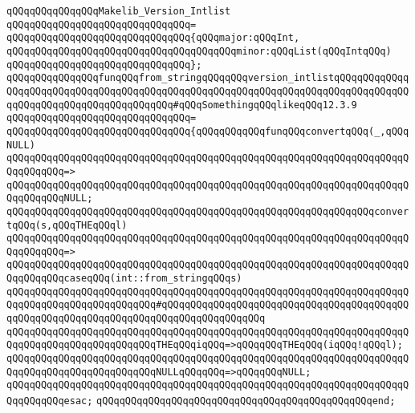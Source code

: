 \verb|qQQqqQQqqQQqqQQqMakelib_Version_Intlist|\newline
\verb|qQQqqQQqqQQqqQQqqQQqqQQqqQQqqQQq=|\newline
\verb|qQQqqQQqqQQqqQQqqQQqqQQqqQQqqQQq{qQQqmajor:qQQqInt,|\newline
\verb|qQQqqQQqqQQqqQQqqQQqqQQqqQQqqQQqqQQqqQQqminor:qQQqList(qQQqIntqQQq)|\newline
\verb|qQQqqQQqqQQqqQQqqQQqqQQqqQQqqQQq};|\newline
\newline
\verb|qQQqqQQqqQQqqQQqfunqQQqfrom_stringqQQqqQQqversion_intlistqQQqqQQqqQQqqQQqqQQqqQQqqQQqqQQqqQQqqQQqqQQqqQQqqQQqqQQqqQQqqQQqqQQqqQQqqQQqqQQqqQQqqQQqqQQqqQQqqQQqqQQqqQQqqQQq#qQQqSomethingqQQqlikeqQQq12.3.9|\newline
\verb|qQQqqQQqqQQqqQQqqQQqqQQqqQQqqQQq=|\newline
\verb|qQQqqQQqqQQqqQQqqQQqqQQqqQQqqQQq{qQQqqQQqqQQqfunqQQqconvertqQQq(_,qQQqNULL)|\newline
\verb|qQQqqQQqqQQqqQQqqQQqqQQqqQQqqQQqqQQqqQQqqQQqqQQqqQQqqQQqqQQqqQQqqQQqqQQqqQQqqQQq=>|\newline
\verb|qQQqqQQqqQQqqQQqqQQqqQQqqQQqqQQqqQQqqQQqqQQqqQQqqQQqqQQqqQQqqQQqqQQqqQQqqQQqqQQqNULL;|\newline
\newline
\verb|qQQqqQQqqQQqqQQqqQQqqQQqqQQqqQQqqQQqqQQqqQQqqQQqqQQqqQQqqQQqqQQqconvertqQQq(s,qQQqTHEqQQql)|\newline
\verb|qQQqqQQqqQQqqQQqqQQqqQQqqQQqqQQqqQQqqQQqqQQqqQQqqQQqqQQqqQQqqQQqqQQqqQQqqQQqqQQq=>|\newline
\verb|qQQqqQQqqQQqqQQqqQQqqQQqqQQqqQQqqQQqqQQqqQQqqQQqqQQqqQQqqQQqqQQqqQQqqQQqqQQqqQQqcaseqQQq(int::from_stringqQQqs)|\newline
\verb|qQQqqQQqqQQqqQQqqQQqqQQqqQQqqQQqqQQqqQQqqQQqqQQqqQQqqQQqqQQqqQQqqQQqqQQqqQQqqQQqqQQqqQQqqQQqqQQq#qQQqqQQqqQQqqQQqqQQqqQQqqQQqqQQqqQQqqQQqqQQqqQQqqQQqqQQqqQQqqQQqqQQqqQQqqQQqqQQqqQQqqQQq|\newline
\verb|qQQqqQQqqQQqqQQqqQQqqQQqqQQqqQQqqQQqqQQqqQQqqQQqqQQqqQQqqQQqqQQqqQQqqQQqqQQqqQQqqQQqqQQqqQQqqQQqTHEqQQqiqQQq=>qQQqqQQqTHEqQQq(iqQQq!qQQql);|\newline
\verb|qQQqqQQqqQQqqQQqqQQqqQQqqQQqqQQqqQQqqQQqqQQqqQQqqQQqqQQqqQQqqQQqqQQqqQQqqQQqqQQqqQQqqQQqqQQqqQQqNULLqQQqqQQq=>qQQqqQQqNULL;|\newline
\verb|qQQqqQQqqQQqqQQqqQQqqQQqqQQqqQQqqQQqqQQqqQQqqQQqqQQqqQQqqQQqqQQqqQQqqQQqqQQqqQQqesac;|\newline
\verb|qQQqqQQqqQQqqQQqqQQqqQQqqQQqqQQqqQQqqQQqqQQqqQQqend;|\newline
